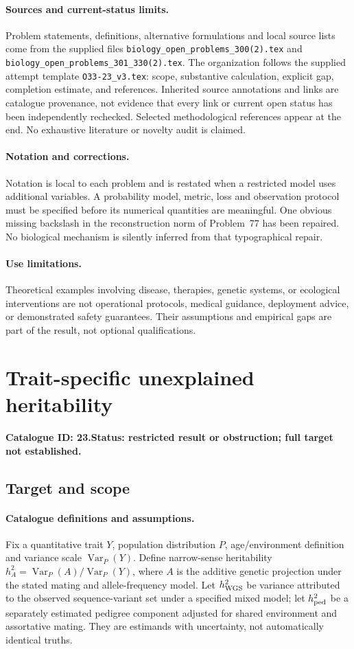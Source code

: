 \documentclass[11pt]{article}
\DeclareMathOperator{\Var}{Var}
\providecommand{\Var}{\operatorname{Var}}
\begin{document}
\paragraph{Sources and current-status limits.}
Problem statements, definitions, alternative formulations and local source lists
come from the supplied files
\texttt{biology\_open\_problems\_300(2).tex} and
\texttt{biology\_open\_problems\_301\_330(2).tex}.
The organization follows the supplied attempt template
\texttt{O33-23\_v3.tex}: scope, substantive calculation, explicit gap,
completion estimate, and references. Inherited source annotations and links are
catalogue provenance, not evidence that every link or current open status has
been independently rechecked. Selected methodological references appear at the
end. No exhaustive literature or novelty audit is claimed.

\paragraph{Notation and corrections.}
Notation is local to each problem and is restated when a restricted model uses
additional variables. A probability model, metric, loss and observation protocol
must be specified before its numerical quantities are meaningful. One obvious
missing backslash in the reconstruction norm of Problem~77 has been repaired.
No biological mechanism is silently inferred from that typographical repair.

\paragraph{Use limitations.}
Theoretical examples involving disease, therapies, genetic systems, or ecological
interventions are not operational protocols, medical guidance, deployment advice,
or demonstrated safety guarantees. Their assumptions and empirical gaps are part
of the result, not optional qualifications.

\setcounter{section}{22}
\section{Trait-specific unexplained heritability}
\label{prob:023}
\noindent\textbf{Catalogue ID: 23.}\quad \textbf{Status: restricted result or obstruction; full target not established.}
\subsection{Target and scope}
\paragraph{Catalogue definitions and assumptions.}
Fix a quantitative trait $Y$, population distribution $P$, age/environment definition and variance scale $\Var_P(Y)$. Define narrow-sense heritability $h_A^2=\Var_P(A)/\Var_P(Y)$, where $A$ is the additive genetic projection under the stated mating and allele-frequency model. Let $h_{\rm WGS}^2$ be variance attributed to the observed sequence-variant set under a specified mixed model; let $h_{\rm ped}^2$ be a separately estimated pedigree component adjusted for shared environment and assortative mating. They are estimands with uncertainty, not automatically identical truths.
\end{document}
